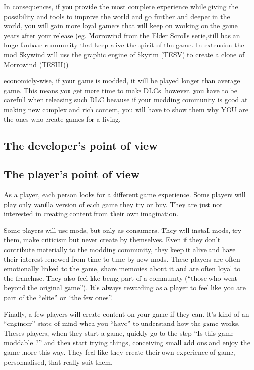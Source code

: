 \documentclass[a4paper,11pt]{article}
\begin{document}
In consequences, if you provide the most complete experience while giving the possibility and tools to improve the world and go further and deeper in the world, you will gain more loyal gamers that will keep on working on the game years after your release (eg. Morrowind from the Elder Scrolls serie,still has an huge fanbase community that keep alive the spirit of the game. In extension the mod Skywind will use the graphic engine of Skyrim (TESV) to create a clone of Morrowind (TESIII)).

economicly-wise, if your game is modded, it will be played longer than average game. This means you get more time to make DLCs. however, you have to be carefull when releasing such DLC because if your modding community is good at making new complex and rich content, you will have to show them why YOU are the ones who create games for a living.


\subsection{The developer's point of view}

\subsection{The player's point of view}

As a player, each person looks for a different game experience. Some players will play only vanilla version of each game they try or buy. They are just not interested in creating content from their own imagination.

Some players will use mods, but only as consumers. They will install mods, try them, make criticism but never create by themselves. Even if they don’t contribute materially to the modding community, they keep it alive and have their interest renewed from time to time by new mods. These players are often emotionally linked to the game, share memories about it and are often loyal to the franchise. They also feel like being part of a community (“those who went beyond the original game”). It’s always rewarding as a player to feel like you are part of the “elite” or “the few ones”.

Finally, a few players will create content on your game if they can. It’s kind of an “engineer” state of mind when you “have” to understand how the game works. Theses players, when they start a game, quickly go to the step “Is this game moddable ?” and then start trying things, conceiving small add ons and enjoy the game more this way. They feel like they create their own experience of game, personnalised, that really suit them. 
\end{document}
